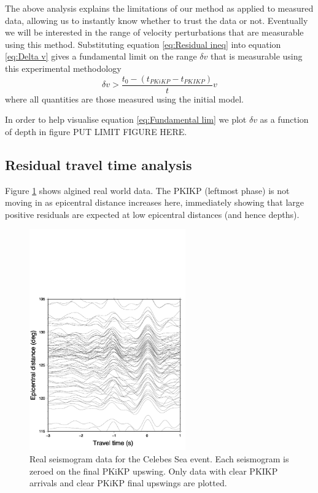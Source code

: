 \documentclass[11pt,a4paper]{article}
\begin{document}
The above analysis explains the limitations of our method as applied to measured data, allowing us to instantly know whether to trust the data or not. Eventually we will be interested in the range of velocity perturbations that are measurable using this method. Substituting equation \eqref{eq:Residual ineq} into equation \eqref{eq:Delta v} gives a fundamental limit on the range $\delta v$ that is measurable using this experimental methodology
\begin{equation}
	\delta v >  \frac{t_{0} -  \left ( t_{PKiKP} - t_{PKIKP} \right )}{t} v
	\label{eq:Fundamental lim}
\end{equation}
where all quantities are those measured using the initial model.

In order to help visualise equation \eqref{eq:Fundamental lim} we plot $\delta v$ as a function of depth in figure PUT LIMIT FIGURE HERE.
\subsection{Residual travel time analysis}
Figure \ref{fig:Real aligned} shows algined real world data. The PKIKP (leftmost phase) is not moving in as epicentral distance increases here, immediately showing that large positive residuals are expected at low epicentral distances (and hence depths).

\begin{figure}
	\centering
	\includegraphics[width=0.6\textwidth]{figures/celebessea/celebessea_real_aligned.pdf}
	\caption{Real seismogram data for the Celebes Sea event. Each seismogram is zeroed on the final PKiKP upswing. Only data with clear PKIKP arrivals and clear PKiKP final upswings are plotted.}
	\label{fig:Real aligned}
\end{figure}
\end{document}
